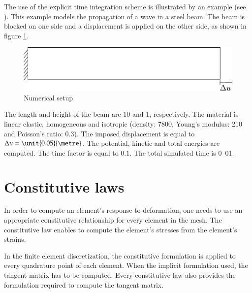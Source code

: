 The use of the explicit time integration scheme is illustrated by an
example (see ).  This
example models the propagation of a wave in a steel beam. The beam is
blocked on one side and a displacement is applied on the other side,
as shown in figure \ref{fig:smm:explicit}.

\begin{figure}[!htb] \centering
  \includegraphics[scale=.6]{figures/explicit_dynamic}
  \caption{Numerical setup \label{fig:smm:explicit}}
\end{figure}

The length and height of the beam are \unit{10}{\metre} and
\unit{1}{\metre}, respectively.  The material is linear elastic,
homogeneous and isotropic (density:
\unit{7800}{\kilogrampercubicmetre}, Young's modulus:
\unit{210}{\giga\pascal} and Poisson's ratio: $0.3$).  The imposed
displacement is equal to $\Delta u = \unit{0.05}{\metre}$. The
potential, kinetic and total energies are computed.  The time factor
is equal to $0.1$.  The total simulated time is \unit{0.01}{\second}.

\section{Constitutive laws \label{sect:smm:CL}} In
order to compute an element's response to deformation, one needs to
use an appropriate constitutive relationship for every element in the
mesh. The constitutive law enables to compute the element's stresses
from the element's strains.

In the finite element discretization, the constitutive formulation is
applied to every quadrature point of each element. When the implicit
formulation used, the tangent matrix has to be computed. Every
constitutive law also provides the formulation required to compute the
tangent matrix.

